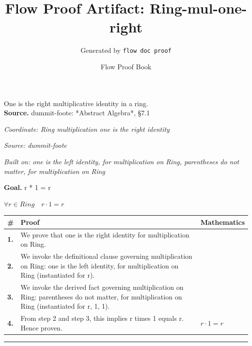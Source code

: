 \documentclass[11pt]{article}
\title{Flow Proof Artifact: Ring-mul-one-right}
\author{Generated by \texttt{flow doc proof}}
\date{Flow Proof Book}
\theoremstyle{definition}
\begin{document}
\maketitle
One is the right multiplicative identity in a ring.\\[0.5em]
\textbf{Source.} dummit-foote: *Abstract Algebra*, §7.1\\[0.5em]
\bigskip
{}\par
\smallskip\noindent\textit{Coordinate: Ring \cdot multiplication \cdot one is the right identity}\par
\smallskip\noindent\textit{Source: dummit-foote}\par
\smallskip\noindent\textit{Built on: one is the left identity, for multiplication on Ring, parentheses do not matter, for multiplication on Ring}\par
\medskip
\noindent\textbf{Goal.} r * 1 = r\par
\noindent$\displaystyle \forall r \in Ring\quad r \cdot 1 = r$\par
\medskip
\noindent
\begin{tabular}{@{} >{\raggedright\arraybackslash}p{} >{\raggedright\arraybackslash}p{} >{\raggedleft\arraybackslash}p{} @{}}
\textbf{\#} & \textbf{Proof} & \textbf{Mathematics} \\
\midrule
\textbf{1.} & We prove that one is the right identity for multiplication on Ring. & \\[0.45em]
\textbf{2.} & We invoke the definitional clause governing multiplication on Ring: one is the left identity, for multiplication on Ring (instantiated for r). & \\[0.45em]
\textbf{3.} & We invoke the derived fact governing multiplication on Ring: parentheses do not matter, for multiplication on Ring (instantiated for r, 1, 1). & \\[0.45em]
\textbf{4.} & From step 2 and step 3, this implies r times 1 equals r. Hence proven. & $\displaystyle r \cdot 1 = r$ \\[0.45em]
\bottomrule
\end{tabular}
\label{thm:Ring-multiplication-one_is_the_right_identity}
\par\medskip\hrule
\end{document}

